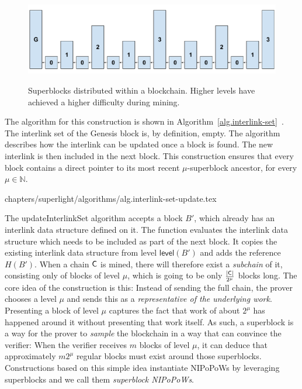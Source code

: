 \begin{figure}[ht]
    \caption{Superblocks distributed within a blockchain.
    Higher levels have achieved a higher difficulty during
    mining.}
    \centering
    \includegraphics[width=0.7\columnwidth,keepaspectratio]{chapters/introduction/figures/superblocks.pdf}
    \label{fig.superblocks}
\end{figure}

The algorithm for this construction is shown in
Algorithm~\ref{alg.interlink-set}~\cite{compactsuperblocks}. The
interlink set of the Genesis block is, by definition, empty. The algorithm
describes how the interlink can be updated once a block is found. The new
interlink is then included in the next block. This construction ensures that
every block contains a direct pointer to its most recent $\mu$-superblock
ancestor, for every $\mu \in \mathbb{N}$.

{chapters/superlight/algorithms/alg.interlink-set-update.tex}

The \textsf{updateInterlinkSet} algorithm accepts a block $B'$, which already has an
interlink data structure defined on it. The function evaluates the
interlink data structure which needs to be included as part of the next block.
It copies the existing interlink data structure from level $\textsf{level}(B')$
and adds the reference $H(B')$.
When a chain $\mathsf{C}$ is mined, there will therefore exist a \emph{subchain} of
it, consisting only of blocks of level $\mu$, which is going to be only
$\frac{|\mathsf{C}|}{2^\mu}$ blocks long. The core idea of the construction is this:
Instead of sending the full chain, the prover chooses a level $\mu$ and sends
this as a \emph{representative of the underlying work}. Presenting a block of
level $\mu$ captures the fact that work of about $2^\mu$ has happened around it
without presenting that work itself. As such, a superblock is a way for the
prover to \emph{sample} the blockchain in a way that can convince the verifier:
When the verifier receives $m$ blocks of level $\mu$, it can deduce that
approximately $m 2^\mu$ regular blocks must exist around those superblocks.
Constructions based on this simple idea instantiate NIPoPoWs by leveraging
superblocks and we call them \emph{superblock NIPoPoWs}.


